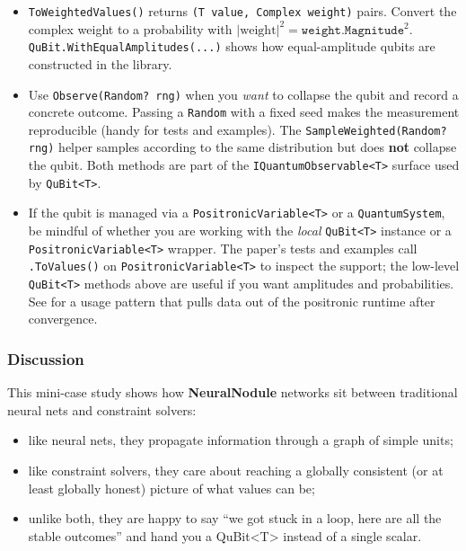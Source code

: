 \documentclass[a4paper,11pt]{article}
\begin{document}
{\raggedright
\begin{itemize}

\item
  \texttt{ToWeightedValues()} returns \texttt{(T value, Complex weight)} pairs.
  Convert the complex weight to a probability with
  $\lvert \text{weight} \rvert^{2} = \texttt{weight.Magnitude}^2$.
  \texttt{QuBit.WithEqualAmplitudes(...)} shows how equal-amplitude qubits are
  constructed in the library.

\item
  Use \texttt{Observe(Random? rng)} when you \emph{want} to collapse the qubit
  and record a concrete outcome. Passing a \texttt{Random} with a fixed seed
  makes the measurement reproducible (handy for tests and examples).
  The \texttt{SampleWeighted(Random? rng)} helper samples according to the same
  distribution but does \textbf{not} collapse the qubit. Both methods are part
  of the \texttt{IQuantumObservable<T>} surface used by \texttt{QuBit<T>}.

\item
  If the qubit is managed via a \texttt{PositronicVariable<T>} or a
  \texttt{QuantumSystem}, be mindful of whether you are working with the
  \emph{local} \texttt{QuBit<T>} instance or a \texttt{PositronicVariable<T>}
  wrapper. The paper’s tests and examples call \texttt{.ToValues()} on
  \texttt{PositronicVariable<T>} to inspect the support; the low-level
  \texttt{QuBit<T>} methods above are useful if you want amplitudes and
  probabilities. See  for a usage
  pattern that pulls data out of the positronic runtime after convergence.

\end{itemize}
\par}

\subsubsection{Discussion}

This mini-case study shows how \textbf{NeuralNodule} networks sit between traditional neural nets and constraint solvers:

\begin{itemize}
\item
  like neural nets, they propagate information through a graph of simple units;
\item
  like constraint solvers, they care about reaching a globally consistent (or at least globally honest) picture of what values can be;
\item
  unlike both, they are happy to say ``we got stuck in a loop, here are all the stable outcomes'' and hand you a QuBit\textless T\textgreater{} instead of a single scalar.
\end{itemize}
\end{document}
